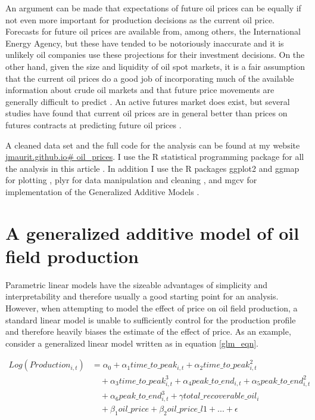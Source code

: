 \documentclass[12pt]{article}
\begin{document}
An argument can be made that expectations of future oil prices can be equally if not even more important for production decisions as the current oil price.  Forecasts for future oil prices are available from, among others, the International Energy Agency, but these have tended to be notoriously inaccurate and it is unlikely oil companies use these projections for their investment decisions.  On the other hand, given the size and liquidity of oil spot markets, it is a fair assumption that the current oil prices do a good job of incorporating much of the available information about crude oil markets and that future price movements are generally difficult to predict \citet{hamilton_understanding_2008}.  An active futures market does exist, but several studies have found that current oil prices are in general better than prices on futures contracts at predicting future oil prices \citep{alquist_what_2010, chinn_predictive_2005}.

A cleaned data set and the full code for the analysis can be found at my website \url{jmaurit.github.io# oil_prices}. I use the R statistical programming package for all the analysis in this article \citet{team_r:_2013}.  In addition I use the R packages ggplot2 and ggmap for plotting \citep{wickham_ggplot2:_2009, kahle_ggmap:_2013}, plyr for data manipulation and cleaning \citep{wickham_split-apply-combine_2011}, and mgcv for implementation of the Generalized Additive Models \citep{wood_fast_2011}.

\section{A generalized additive model of oil field production}
Parametric linear models have the sizeable advantages of simplicity and interpretability and therefore usually a good starting point for an analysis.  However, when attempting to model the effect of price on oil field production, a standard linear model is unable to sufficiently control for the production profile and therefore heavily biases the estimate of the effect of price.  As an example, consider a generalized linear model written as in equation \ref{glm_eqn}. 

	\begin{equation}
	\begin{split}
	 Log(Production_{i,t}) & = \alpha_0 + \alpha_1 time\_to\_peak_{i,t} + \alpha_2 time\_to\_peak_{i,t}^2 \\
	& \quad + \alpha_3 time\_to\_peak_{i,t}^3  + \alpha_4 peak\_to\_end_{i,t} + \alpha_5 peak\_to\_end_{i,t}^2 \\
	& \quad + \alpha_6 peak\_to\_end_{i,t}^3 + \gamma total\_recoverable\_oil_i \\
	& \quad + \beta_1 oil\_price + \beta_2 oil\_price\_l1 + ...+ \epsilon
	\end{split}
\label{glm_eqn}
	\end{equation}
\end{document}
